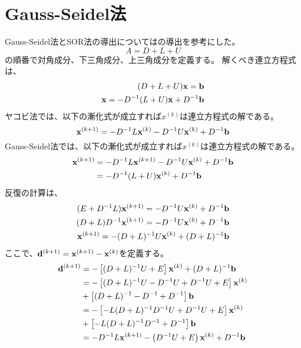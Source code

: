 \documentclass{jsarticle}
\date{\today}
\author{山田龍}
\title{}
\newcommand{\kakko}[1][]{(#1)}
\newcommand{\bx}{\bold{x}}
\newcommand{\bb}{\bold{b}}
\newcommand{\bd}{\bold{d}}
\begin{document}
\maketitle
\section{Gauss-Seidel法}
Gauss-Seidel法とSOR法の導出については\cite{suuchi}の導出を参考にした。
\begin{equation}
    A = D + L + U
\end{equation}
の順番で対角成分、下三角成分、上三角成分を定義する。
解くべき連立方程式は、
\begin{align}
  (D + L + U)\bx = \bb  \\
  \bx = -D^{-1}(L + U)\bx +  D^{-1} \bb 
\end{align}
ヤコビ法では、以下の漸化式が成立すれば$x^{\kakko[k]}$は連立方程式の解である。
\begin{equation}
    \bx^{\kakko[k+1]} = - D^{-1} L \bx^{\kakko[k]}\\
    - D^{-1} U \bx^{\kakko[k]} + D^{-1}\bold{b} 
\end{equation}
Gauss-Seidel法では、以下の漸化式が成立すれば$x^{\kakko[k]}$は連立方程式の解である。
\begin{align}
    \bx^{\kakko[k+1]} &= - D^{-1} L \bx^{\kakko[k+1]}
    - D^{-1} U \bx^{\kakko[k]} + D^{-1}\bold{b}\\
    &=- D^{-1} (L + U) \bx^{\kakko[k]} + D^{-1}\bold{b} 
\end{align}
反復の計算は、
\begin{align*}
    (E + D^{-1}L)\bx^{\kakko[k+1]} = - D^{-1} U \bx^{\kakko[k]} + D^{-1}\bold{b}\\
    (D + L)D^{-1}\bx^{\kakko[k+1]} = - D^{-1} U \bx^{\kakko[k]} + D^{-1}\bold{b}\\
    \bx^{\kakko[k+1]} = - (D + L)^{-1}U \bx^{\kakko[k]} +(D + L)^{-1}\bold{b}\\
\end{align*}
ここで、$\bd^{\kakko[k+1]} = \bx^{\kakko[k+1]} - \bx^{\kakko[k]}$を定義する。
\begin{align*}
  \bd^{\kakko[k+1]} &= - \left[ (D + L)^{-1}U + E\right] \bx^{\kakko[k]} + (D + L)^{-1}\bb\\
  &= - \left[ (D + L)^{-1}U - D^{-1}U + D^{-1}U+ E\right] \bx^{\kakko[k]}\\
  &+ \left[(D + L)^{-1} - D^{-1} + D^{-1}\right]\bb\\
  &= - \left[ - L(D + L)^{-1}D^{-1}U + D^{-1}U+ E\right] \bx^{\kakko[k]}\\
  &+ \left[- L(D + L)^{-1}D^{-1}+ D^{-1}\right]\bb\\
  &= - D^{-1}L \bx^{\kakko[k+1]}- \left( D^{-1}U+ E\right) \bx^{\kakko[k]} + D^{-1}\bb
\end{align*}
\end{document}
